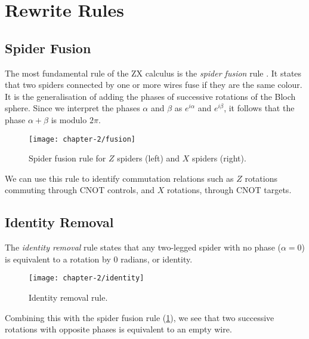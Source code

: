\section{Rewrite Rules}

\subsection{Spider Fusion}%
The most fundamental rule of the ZX calculus is the \textit{spider fusion} rule \cite{Wetering2020}. It states that two spiders connected by one or more wires fuse if they are the same colour. It is the generalisation of adding the phases of successive rotations of the Bloch sphere. Since we interpret the phases $\alpha$ and $\beta$ as $e^{i\alpha}$ and $e^{i\beta}$, it follows that the phase $\alpha + \beta$ is modulo $2\pi$.

\begin{figure}[H]
    \centering
    \texttt{[image: chapter-2/fusion]}
    \caption{Spider fusion rule for $Z$ spiders (left) and $X$ spiders (right).}
    \label{spider-fusion}
\end{figure}

We can use this rule to identify commutation relations such as $Z$ rotations commuting through CNOT controls, and $X$ rotations, through CNOT targets.



\subsection{Identity Removal}%

The \textit{identity removal} rule states that any two-legged spider with no phase ($\alpha = 0$) is equivalent to a rotation by 0 radians, or identity.

\begin{figure}[H]
    \centering
    \texttt{[image: chapter-2/identity]}
    \caption{Identity removal rule.}
    \label{identity}
\end{figure}

Combining this with the spider fusion rule (\ref{spider-fusion}), we see that two successive rotations with opposite phases is equivalent to an empty wire.


